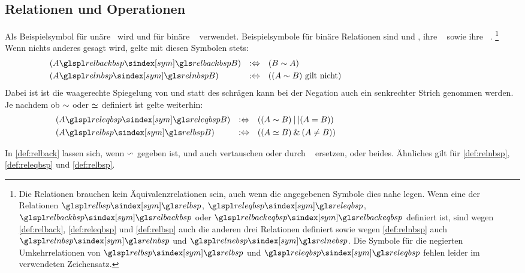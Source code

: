 \subsection{Relationen und Operationen}%
\label{sub:Beispielsymbole}

Als Beispielsymbol für unäre \Operationen\ wird  und für binäre \Operationen\  verwendet.
Beispielsymbole für binäre Relationen sind  und , ihre   \textbzw\  sowie ihre   \textbzw\ .%
\footnote{%
	Die Relationen brauchen kein Äquivalenzrelationen sein, auch wenn die angegebenen Symbole dies nahe legen.
	Wenn eine der Relationen $\glsSym{relbsp}$, $\glsSym{releqbsp}$, $\glsSym{relbackbsp}$ oder $\glsSym{relbackeqbsp}$ definiert ist, sind wegen \eqref{def:relback}, \eqref{def:releqbsp} und \eqref{def:relbsp} auch die anderen drei Relationen definiert sowie wegen \eqref{def:relnbsp} auch $\glsSym{relnbsp}$ und $\glsSym{relnebsp}$.
	Die Symbole für die negierten Umkehrrelationen von $\glsSym{relbsp}$ und $\glsSym{releqbsp}$ fehlen leider im verwendeten Zeichensatz.
}
Wenn nichts anderes gesagt wird, gelte mit diesen Symbolen stets:
\begin{align}
	& (A \glsSym{relbackbsp} B) & \metadefeq & \quad  (B \relbsp  A)
	\label{def:relback}  \\
	& (A \glsSym{relnbsp}    B) & \metadefeq & \quad ((A \relbsp   B) \text{ gilt nicht})
	\label{def:relnbsp}  \formulatoleft\formulatoleft\formulatoleft
\end{align}
Dabei ist \chrqt{$\relbackbsp$} ist die waagerechte Spiegelung von \chrqt{$\relbsp$} und statt des schrägen kann bei der Negation auch ein senkrechter Strich genommen werden.
Je nachdem ob $\relbsp$ oder $\releqbsp$ definiert ist gelte weiterhin:
\begin{align}
	& (A \glsSym{releqbsp}   B) & \metadefeq & \quad ((A \relbsp   B) \metaor  (A \eq B))
	\label{def:releqbsp} \\
	& (A \glsSym{relbsp}     B) & \metadefeq & \quad ((A \releqbsp B) \metaand (A \ne B))
	\label{def:relbsp}   \formulatoleft\formulatoleft\formulatoleft
\end{align}

In \eqref{def:relback} lassen sich, wenn $\relbackbsp$ gegeben ist, \chrqt{$\relbackbsp$} und \chrqt{$\relbsp$} auch vertauschen oder durch \chrqt{$\relbackeqbsp$} \textbzw\ \chrqt{$\releqbsp$} ersetzen, oder beides.
Ähnliches gilt für \eqref{def:relnbsp}, \eqref{def:releqbsp} und \eqref{def:relbsp}.

